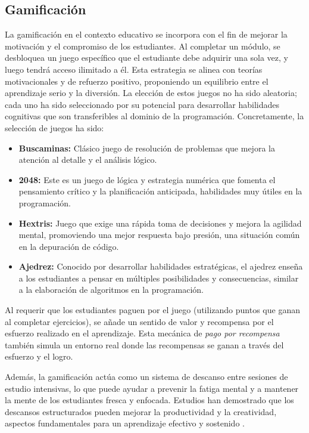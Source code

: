 \subsection{Gamificación}

La gamificación en el contexto educativo se incorpora con el fin de mejorar la motivación y el compromiso de los estudiantes. Al completar un módulo, se desbloquea un juego específico que el estudiante debe adquirir una sola vez, y luego tendrá acceso ilimitado a él. Esta estrategia se alinea con teorías motivacionales y de refuerzo positivo, proponiendo un equilibrio entre el aprendizaje serio y la diversión. La elección de estos juegos no ha sido aleatoria; cada uno ha sido seleccionado por su potencial para desarrollar habilidades cognitivas que son transferibles al dominio de la programación. Concretamente, la selección de juegos ha sido:

\begin{itemize}
    \item \textbf{Buscaminas:} Clásico juego de resolución de problemas que mejora la atención al detalle y el análisis lógico.
    
    \item \textbf{2048:} Este es un juego de lógica y estrategia numérica que fomenta el pensamiento crítico y la planificación anticipada, habilidades muy útiles en la programación.
    
    \item \textbf{Hextris:} Juego que exige una rápida toma de decisiones y mejora la agilidad mental, promoviendo una mejor respuesta bajo presión, una situación común en la depuración de código.
    
    \item \textbf{Ajedrez:} Conocido por desarrollar habilidades estratégicas, el ajedrez enseña a los estudiantes a pensar en múltiples posibilidades y consecuencias, similar a la elaboración de algoritmos en la programación.
\end{itemize}

Al requerir que los estudiantes paguen por el juego (utilizando puntos que ganan al completar ejercicios), se añade un sentido de valor y recompensa por el esfuerzo realizado en el aprendizaje. Esta mecánica de  \textit{pago por recompensa} también simula un entorno real donde las recompensas se ganan a través del esfuerzo y el logro.

Además, la gamificación actúa como un sistema de descanso entre sesiones de estudio intensivas, lo que puede ayudar a prevenir la fatiga mental y a mantener la mente de los estudiantes fresca y enfocada. Estudios han demostrado que los descansos estructurados pueden mejorar la productividad y la creatividad, aspectos fundamentales para un aprendizaje efectivo y sostenido \cite{ariga2011brief}.

